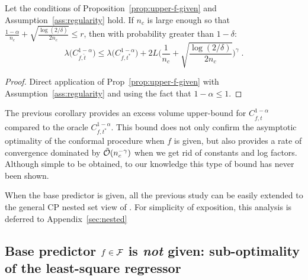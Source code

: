 \begin{corollary}
    \label{cor:f-given}
    Let the conditions of Proposition~\ref{prop:upper-f-given} and Assumption~\ref{ass:regularity} hold. If $n_c$ is large enough so that $\frac{1-\alpha}{n_c} + \sqrt{\frac{\log(2/\delta)}{2n_c}} \leq r$, then with probability greater than $1-\delta$:
    \begin{equation}
        \label{eq:upper-f-given-final}
        \lambda\Big(C^{1-\alpha}_{f,\hat{t}}\Big) \leq \lambda\Big(C^{1-\alpha}_{f,t^*}\Big) + 2 L\Big(\frac{1}{n_c} + \sqrt{\frac{\log(2/\delta)}{2n_c}}\Big)^\gamma\;.
    \end{equation} 
\end{corollary}
\begin{proof}
    Direct application of Prop~\ref{prop:upper-f-given} with Assumption~\ref{ass:regularity} and using the fact that $1-\alpha\leq1$. %
\end{proof}

The previous corollary provides an excess volume upper-bound for $C^{1-\alpha}_{f,\hat{t}}$ compared to the oracle $C^{1-\alpha}_{f,t^*}$. This bound does not only confirm the asymptotic optimality of the conformal procedure when $f$ is given, but also provides a rate of convergence dominated by $\tilde{{\cal O}}(n_c^{-\gamma})$ when we get rid of constants and log factors. Although simple to be obtained, to our knowledge this type of bound has never been shown.%

\begin{remark}
    \label{rmk:nested}
    When the base predictor is given, all the previous study can be easily extended to the general CP nested set view of \citet{gupta2022nested}. For simplicity of exposition, this analysis is deferred to Appendix~\ref{sec:nested}
\end{remark}


\subsection{Base predictor $f\in\mathcal{F}$ is \emph{not} given: sub-optimality of the least-square regressor}

